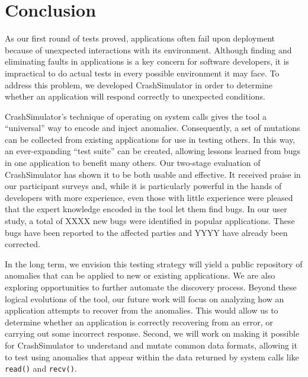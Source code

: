 \section{Conclusion}
\label{SEC:conclusion}

As our first round of tests proved,
applications often fail upon deployment because of unexpected interactions
with its environment.
Although finding and eliminating
faults in applications is a key concern for software developers, it is
impractical to do actual tests in every possible
environment it may face.
To address this problem, we developed CrashSimulator
in order to determine whether an application will
respond correctly to unexpected conditions.

CrashSimulator's
technique of
operating on system calls gives the tool a ``universal'' way to
encode and inject anomalies. Consequently, a set of mutations can be
collected from existing applications for use in testing others.
In this way, an ever-expanding ``test suite'' can be
created, allowing lessons learned from bugs in one application to benefit
many others.
Our two-stage evaluation of CrashSimulator
has shown it to be both usable and
effective.  It received praise in our participant surveys and,
while it is particularly powerful in the hands of developers with more
experience,
even those with little experience were pleased that
the expert knowledge encoded in the tool
let them find bugs.
In our user study, a total of
XXXX new bugs were identified in popular applications.
These bugs have been reported to the
affected parties and YYYY have already been corrected.

In the long term, we
envision this testing strategy will yield a public repository of anomalies
that can be applied to new or existing applications.
We are also exploring
opportunities to further automate the discovery process.
Beyond these logical
evolutions of the tool, our future work
will focus on analyzing how an
application attempts
to recover from the anomalies.  This would allow
us to determine whether
an application is correctly recovering
from an error, or carrying out some incorrect response.
Second, we will work on making it possible for CrashSimulator to
understand and mutate common data formats, allowing it to test using
anomalies that appear within the data returned by system calls like {\tt
read()} and {\tt recv()}.
